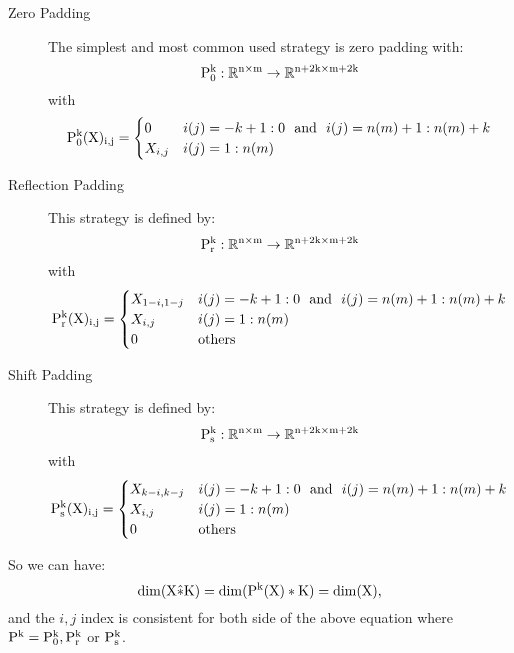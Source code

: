 \begin{description}
\item[Zero Padding] The simplest and most common used strategy is zero padding with:
\begin{equation}
\rm{P}^k_0: \mathbb{R}^{n \times m} \to \mathbb{R}^{n+2k \times m+2k}
\end{equation}
with 
\begin{equation}
\rm{P}_0^k(X)_{i,j} = \begin{cases}
0 &i(j)=-k+1:0 ~~\text{and}~~ i(j) = n(m)+1:n(m)+k \\
X_{i,j} &i(j) = 1:n(m) 
\end{cases}
\end{equation}
\item[Reflection Padding] This strategy is defined by:
\begin{equation}
\rm{P}^k_r: \mathbb{R}^{n \times m} \to \mathbb{R}^{n+2k \times m+2k}
\end{equation}
with 
\begin{equation}
\rm{P}_r^k(X)_{i,j} = \begin{cases}
X_{1-i, 1-j} &i(j)=-k+1:0 ~~\text{and}~~ i(j) = n(m)+1:n(m)+k \\
X_{i,j} &i(j) = 1:n(m) \\
0 &\text{others} 
\end{cases}
\end{equation}
\item[Shift Padding] This strategy is defined by:
\begin{equation}
\rm{P}^k_s: \mathbb{R}^{n \times m} \to \mathbb{R}^{n+2k \times m+2k}
\end{equation}
with 
\begin{equation}
\rm{P}_s^k(X)_{i,j} = \begin{cases}
X_{k-i, k-j} &i(j)=-k+1:0 ~~\text{and}~~ i(j) = n(m)+1:n(m)+k \\
X_{i,j} &i(j) = 1:n(m) \\
0 &\text{others} 
\end{cases}
\end{equation}
\end{description}

So we can have:
\begin{equation}
\rm{dim}(X\hat{\ast}K) = \rm{dim}(\rm{P}^k(X) \ast K) = \rm{dim}(X),
\end{equation}
and the $i,j$ index is consistent for both side of the above equation where $\rm{P}^k = \rm{P}_0^k, \rm{P}_{r}^k$ or $\rm{P}_s^k$.


